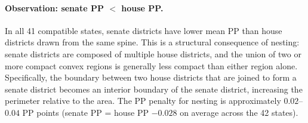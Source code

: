 \paragraph{Observation: senate PP $<$ house PP.}
In all 41 compatible states, senate districts have lower mean PP than house
districts drawn from the same spine. This is a structural consequence of
nesting: senate districts are composed of multiple house districts, and the
union of two or more compact convex regions is generally less compact than
either region alone. Specifically, the boundary between two house districts
that are joined to form a senate district becomes an interior boundary
of the senate district, increasing the perimeter relative to the area.
The PP penalty for nesting is approximately $0.02$--$0.04$ PP points
(senate PP = house PP $- 0.028$ on average across the 42 states).
